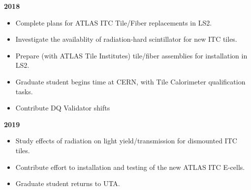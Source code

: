 \textbf{2018}
\begin{itemize}[noitemsep,nolistsep]
\item{Complete plans for ATLAS ITC Tile/Fiber replacements in LS2.}
\item{Investigate the availablity of radiation-hard scintillator for new ITC tiles.}
\item{Prepare (with ATLAS Tile Institutes) tile/fiber assemblies for installation in LS2.}
\item{Graduate student begins time at CERN, with Tile Calorimeter qualification tasks.}
\item{Contribute DQ Validator shifts}
\end{itemize}

\textbf{2019}
\begin{itemize}[noitemsep,nolistsep]
\item{Study effects of radiation on light yield/transmission for dismounted ITC tiles.}
\item{Contribute effort to installation and testing of the new ATLAS ITC E-cells.}
\item{Graduate student returns to UTA.}
\end{itemize}
